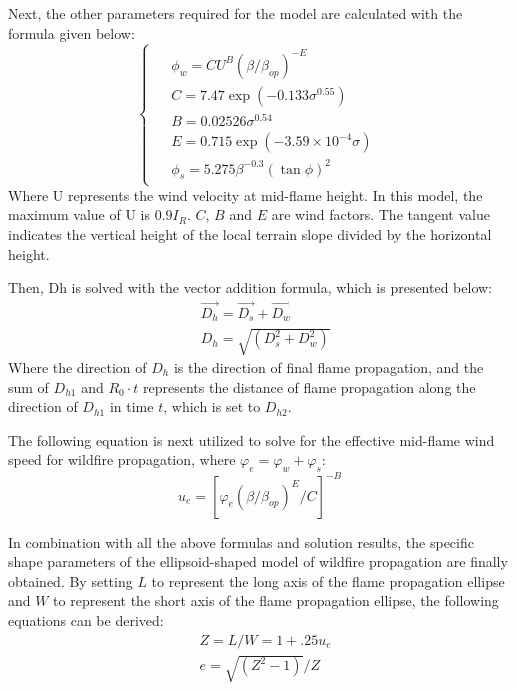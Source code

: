 \documentclass[12pt]{article}  %
\begin{document}
Next, the other parameters required for the model are calculated with the formula given below:
\begin{equation}
	\begin{cases}
	\begin{aligned}
		& \phi_w=C U^B\left(\beta / \beta_{o p}\right)^{-E} \\
		& C=7.47 \exp \left(-0.133 \sigma^{0.55}\right) \\
		& B=0.02526 \sigma^{0.54} \\
		& E=0.715 \exp \left(-3.59 \times 10^{-4} \sigma\right) \\
		& \phi_s=5.275 \beta^{-0.3}(\tan \phi)^2
	\end{aligned}
	\end{cases}
\end{equation}
Where U represents the wind velocity at mid-flame height. In this model, the maximum value of U is $0.9I_R$. $C$, $B$ and $E$ are wind factors. The tangent value indicates the vertical height of the local terrain slope divided by the horizontal height.

Then, Dh is solved with the vector addition formula, which is presented below:
\begin{equation}
	\begin{aligned}
		& \vec{D_h} = \vec{D_s} + \vec{D_w} \\
		& D_h=\sqrt{\left(D_s^2+D_w^2 \right)}
	\end{aligned}
\end{equation}
Where the direction of $D_h$ is the direction of final flame propagation, and the sum of $D_{h1}$ and $R_0\cdot t$ represents the distance of flame propagation along the direction of $D_{h1}$ in time $t$, which is set to $D_{h2}$.

The following equation is next utilized to solve for the effective mid-flame wind speed for wildfire propagation, where $\varphi_e = \varphi_w + \varphi_s$:
\begin{equation}
	u_e=\left[\varphi_e \left(\beta / \beta_{o p}\right)^E / C\right]^{-B}
\end{equation}

In combination with all the above formulas and solution results, the specific shape parameters of the ellipsoid-shaped model of wildfire propagation are finally obtained. By setting $L$ to represent the long axis of the flame propagation ellipse and $W$ to represent the short axis of the flame propagation ellipse, the following equations can be derived:
\begin{equation}
	\begin{aligned}
		& Z=L / W=1+.25u_e \\
		& e=\sqrt{\left(Z^2-1\right)} / Z
	\end{aligned}
\end{equation}
\end{document}

